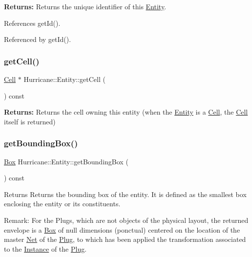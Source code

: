 {\bfseries Returns\+:} Returns the unique identifier of this \hyperlink{classHurricane_1_1Entity}{Entity}. 

References get\+Id().



Referenced by get\+Id().

\mbox{\label{classHurricane_1_1Entity_a42bdf015f583be477cc54b48652b1007}} 
\subsubsection{\texorpdfstring{get\+Cell()}{getCell()}}
{\footnotesize\ttfamily \hyperlink{classHurricane_1_1Cell}{Cell} $\ast$ Hurricane\+::\+Entity\+::get\+Cell (\begin{DoxyParamCaption}{ }\end{DoxyParamCaption}) const\hspace{0.3cm}{\ttfamily [pure virtual]}}

{\bfseries Returns\+:} Returns the cell owning this entity (when the \hyperlink{classHurricane_1_1Entity}{Entity} is a \hyperlink{classHurricane_1_1Cell}{Cell}, the \hyperlink{classHurricane_1_1Cell}{Cell} itself is returned) \mbox{\label{classHurricane_1_1Entity_ad834f8ce33a08a13e2a88446696e63e7}} 
\subsubsection{\texorpdfstring{get\+Bounding\+Box()}{getBoundingBox()}}
{\footnotesize\ttfamily \hyperlink{classHurricane_1_1Box}{Box} Hurricane\+::\+Entity\+::get\+Bounding\+Box (\begin{DoxyParamCaption}{ }\end{DoxyParamCaption}) const\hspace{0.3cm}{\ttfamily [pure virtual]}}

\begin{DoxyReturn}{Returns}
Returns the bounding box of the entity. It is defined as the smallest box enclosing the entity or its constituents.
\end{DoxyReturn}
\begin{DoxyParagraph}{Remark\+:}
For the Plugs, which are not objects of the physical layout, the returned envelope is a \hyperlink{classHurricane_1_1Box}{Box} of null dimensions (ponctual) centered on the location of the master \hyperlink{classHurricane_1_1Net}{Net} of the \hyperlink{classHurricane_1_1Plug}{Plug}, to which has been applied the transformation associated to the \hyperlink{classHurricane_1_1Instance}{Instance} of the \hyperlink{classHurricane_1_1Plug}{Plug}. 
\end{DoxyParagraph}


